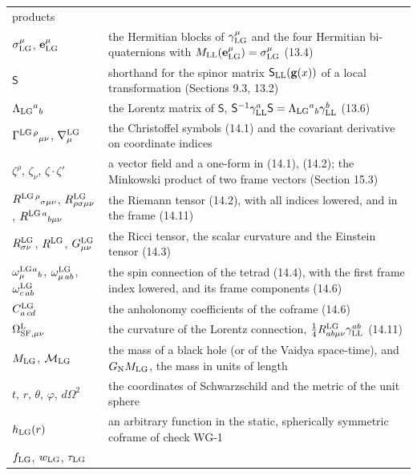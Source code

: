 \documentclass[
  10pt,
]{article}
\begin{document}
\begin{longtable}[]{@{}
  >{\raggedright\arraybackslash}p{}
  >{\raggedright\arraybackslash}p{}@{}}
products \\
\(\sigma^\mu_{\rm LG}\), \(\mathbf e^\mu_{\rm LG}\) & the Hermitian
blocks of \(\gamma^\mu_{\rm LG}\) and the four Hermitian bi-quaternions
with \(M_{\rm LL}(\mathbf e^\mu_{\rm LG})=\sigma^\mu_{\rm LG}\)
(13.4) \\
\(\mathsf S\) & shorthand for the spinor matrix
\(\mathsf S_{\rm LL}(\mathbf g(x))\) of a local transformation (Sections
9.3, 13.2) \\
\(\Lambda_{\rm LG}{}^a{}_b\) & the Lorentz matrix of \(\mathsf S\),
\(\mathsf S^{-1}\gamma^a_{\rm LL}\mathsf S=\Lambda_{\rm LG}{}^a{}_b\gamma^b_{\rm LL}\)
(13.6) \\
\(\Gamma^{{\rm LG}\,\rho}{}_{\mu\nu}\), \(\nabla^{\rm LG}_\mu\) & the
Christoffel symbols (14.1) and the covariant derivative on coordinate
indices \\
\(\zeta^\rho\), \(\zeta_\nu\), \(\zeta\cdot\zeta'\) & a vector field and
a one-form in (14.1), (14.2); the Minkowski product of two frame vectors
(Section 15.3) \\
\(R^{{\rm LG}\,\rho}{}_{\sigma\mu\nu}\),
\(R^{\rm LG}_{\rho\sigma\mu\nu}\), \(R^{{\rm LG}\,a}{}_{b\mu\nu}\) & the
Riemann tensor (14.2), with all indices lowered, and in the frame
(14.11) \\
\(R^{\rm LG}_{\sigma\nu}\), \(R^{\rm LG}\), \(G^{\rm LG}_{\mu\nu}\) &
the Ricci tensor, the scalar curvature and the Einstein tensor (14.3) \\
\(\omega^{\rm LG}_\mu{}^a{}_b\), \(\omega^{\rm LG}_{\mu\,ab}\),
\(\omega^{\rm LG}_{c\,ab}\) & the spin connection of the tetrad (14.4),
with the first frame index lowered, and its frame components (14.6) \\
\(C^{\rm LG}_{a\,cd}\) & the anholonomy coefficients of the coframe
(14.6) \\
\(\Omega^{\rm L}_{{\rm SF},\mu\nu}\) & the curvature of the Lorentz
connection, \(\tfrac14R^{\rm LG}_{ab\mu\nu}\gamma^{ab}_{\rm LL}\)
(14.11) \\
\(M_{\rm LG}\), \(\mathcal M_{\rm LG}\) & the mass of a black hole (or
of the Vaidya space-time), and \(G_{\rm N}M_{\rm LG}\), the mass in
units of length \\
\(t\), \(r\), \(\theta\), \(\varphi\), \(d\Omega^2\) & the coordinates
of Schwarzschild and the metric of the unit sphere \\
\(h_{\rm LG}(r)\) & an arbitrary function in the static, spherically
symmetric coframe of check WG-1 \\
\(f_{\rm LG}\), \(w_{\rm LG}\), \(\tau_{\rm LG}\) &

\end{longtable}
\end{document}
